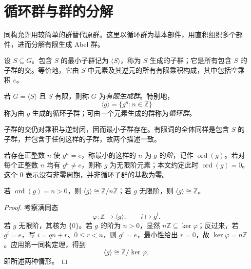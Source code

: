 \documentclass[lang=cn,a4paper,fontset=none,zihao=false,10pt,openany,twoside]{beautybook}
\numberwithin{algorithm}{chapter}
\begin{document}
\section{循环群与群的分解}\label{sec:group-decomposition}
同构允许用较简单的群替代原群。这里以循环群为基本部件，用直积组织多个部件，进而分解有限生成 Abel 群。
\begin{definition}[生成子群与循环群]
设 $S\subseteq G$。包含 $S$ 的最小子群记为 $\langle S\rangle$，称为 $S$ 生成的子群；它是所有包含 $S$ 的子群的交。等价地，它由 $S$ 中元素及其逆元的所有有限乘积构成，其中包括空乘积 $e$。

若 $G=\langle S\rangle$ 且 $S$ 有限，则称 $G$ 为\emph{有限生成群}。特别地，
\[
 \langle g\rangle=\{g^n:n\in\mathbb Z\}
\]
称为由 $g$ 生成的循环子群；可由一个元素生成的群称为\emph{循环群}。
\end{definition}
子群的交仍对乘积与逆封闭，因而最小子群存在。有限词的全体同样是包含 $S$ 的子群，并包含于任何这样的子群，故两个描述一致。

\begin{definition}[元素的阶]
若存在正整数 $n$ 使 $g^n=e$，称最小的这样的 $n$ 为 $g$ 的\emph{阶}，记作 $\operatorname{ord}(g)$。若对每个正整数 $n$ 均有 $g^n\ne e$，则称 $g$ 为无限阶元素；本文约定此时 $\operatorname{ord}(g)=0$。这个 $0$ 表示没有非零周期，并非循环子群的基数为零。
\end{definition}
\begin{proposition}[循环群的分类]\label{prop:cyclic-classification}
若 $\operatorname{ord}(g)=n>0$，则 $\langle g\rangle\cong\mathbb Z/n\mathbb Z$；若 $g$ 无限阶，则 $\langle g\rangle\cong\mathbb Z$。
\end{proposition}
\begin{proof}
考察满同态
\[
 \varphi:\mathbb Z\longrightarrow\langle g\rangle,
 \qquad i\longmapsto g^i.
\]
若 $g$ 无限阶，其核为 $\{0\}$。若 $g$ 的阶为 $n>0$，显然 $n\mathbb Z\subseteq\ker\varphi$；反过来，若 $g^i=e$，写 $i=qn+r$、$0\le r<n$，则 $g^r=e$，最小性给出 $r=0$，故 $\ker\varphi=n\mathbb Z$。应用第一同构定理，得到
\[
 \langle g\rangle\cong\mathbb Z/\ker\varphi,
\]
即所述两种情形。
\end{proof}
\end{document}
